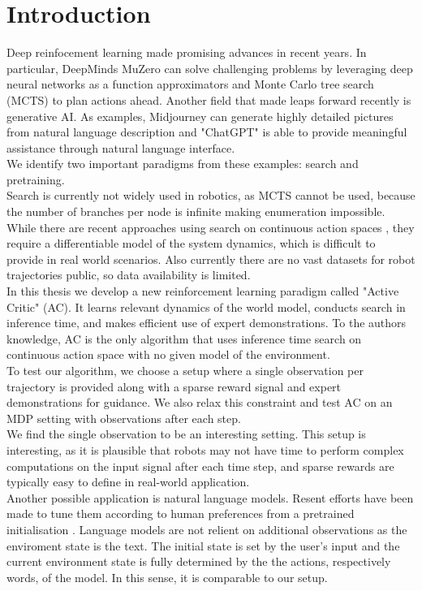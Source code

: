 \chapter{Introduction}
\label{chapter:Introduction}
Deep reinfocement learning made promising advances in recent years. In particular, DeepMinds MuZero \cite{MUZero} can solve challenging problems by leveraging deep neural networks as a function 
approximators and Monte Carlo tree search (MCTS) to plan actions ahead. 
Another field that made leaps forward recently is generative AI. As examples, Midjourney \cite{midjourney} 
can generate highly detailed pictures from natural 
language description and "ChatGPT" is able to provide meaningful assistance through natural language interface. \\
We identify two important paradigms from these examples: search and pretraining. \\
Search is currently not widely used in robotics, as MCTS cannot be used, because the number of branches per node is infinite making enumeration impossible. While there are recent approaches 
using search on continuous action spaces \cite{Manna2022} \cite{Lee_Jeon_Kim_Kim_2020}, they require a differentiable model of the system dynamics, which is difficult to provide in real world scenarios. 
Also currently there are no vast datasets for robot trajectories public, so data availability is limited.\\ 
In this thesis we develop a new reinforcement learning 
paradigm called "Active Critic" (AC). It learns relevant dynamics of the world model, conducts search in inference time, and makes efficient use of expert demonstrations. 
To the authors knowledge, AC is the only algorithm that uses inference time search on continuous action space with no given model of the environment.\\
To test our algorithm, we choose a setup where a single observation per trajectory is provided along with a sparse reward signal and expert demonstrations for guidance. 
We also relax this constraint and test AC on an MDP setting with observations after each step.\\

We find the single observation to be an interesting setting. This setup is interesting, as it is plausible that robots may not have time to perform complex computations 
on the input signal after each time step, and sparse rewards are typically easy to define in real-world application.\\
Another possible application is natural language models. Resent efforts have been made to tune 
them according to human preferences from a pretrained initialisation \cite{cite:ChatGPT}. Language models are not relient on additional observations as the enviroment state is the 
text. The initial state is set by the user's input and the current environment state is fully determined by the the actions, respectively words, of the model. 
In this sense, it is comparable to our setup.\\


